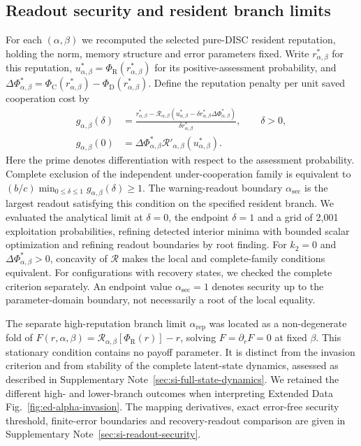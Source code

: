 \documentclass[fleqn,10pt]{wlscirep}
\begin{document}
\subsection*{Readout security and resident branch limits}
\label{sec:methods-readout-security}

For each $(\alpha,\beta)$ we recomputed the selected pure-DISC resident reputation, holding the norm, memory structure and error parameters fixed. Write $r^*_{\alpha,\beta}$ for this reputation, $u^*_{\alpha,\beta}=\Phi_{\mathrm R}(r^*_{\alpha,\beta})$ for its positive-assessment probability, and $\Delta\Phi^*_{\alpha,\beta}=\Phi_{\mathrm C}(r^*_{\alpha,\beta})-\Phi_{\mathrm D}(r^*_{\alpha,\beta})$. Define the reputation penalty per unit saved cooperation cost by
\begin{equation}
\begin{aligned}
g_{\alpha,\beta}(\delta)
&=\frac{r^*_{\alpha,\beta}-\mathcal R_{\alpha,\beta}
\left(u^*_{\alpha,\beta}-\delta r^*_{\alpha,\beta}\Delta\Phi^*_{\alpha,\beta}\right)}
{\delta r^*_{\alpha,\beta}},\qquad \delta>0,\\
g_{\alpha,\beta}(0)
&=\Delta\Phi^*_{\alpha,\beta}\mathcal R'_{\alpha,\beta}(u^*_{\alpha,\beta}).
\end{aligned}
\label{eq:methods-readout-penalty}
\end{equation}
Here the prime denotes differentiation with respect to the assessment probability. Complete exclusion of the independent under-cooperation family is equivalent to $(b/c)\min_{0\leq\delta\leq1}g_{\alpha,\beta}(\delta)\geq1$. The warning-readout boundary $\alpha_{\mathrm{sec}}$ is the largest readout satisfying this condition on the specified resident branch. We evaluated the analytical limit at $\delta=0$, the endpoint $\delta=1$ and a grid of 2,001 exploitation probabilities, refining detected interior minima with bounded scalar optimization and refining readout boundaries by root finding. For $k_2=0$ and $\Delta\Phi^*_{\alpha,\beta}>0$, concavity of $\mathcal R$ makes the local and complete-family conditions equivalent. For configurations with recovery states, we checked the complete criterion separately. An endpoint value $\alpha_{\mathrm{sec}}=1$ denotes security up to the parameter-domain boundary, not necessarily a root of the local equality.

The separate high-reputation branch limit $\alpha_{\mathrm{rep}}$ was located as a non-degenerate fold of $F(r,\alpha,\beta)=\mathcal R_{\alpha,\beta}[\Phi_{\mathrm R}(r)]-r$, solving $F=\partial_rF=0$ at fixed $\beta$. This stationary condition contains no payoff parameter. It is distinct from the invasion criterion and from stability of the complete latent-state dynamics, assessed as described in Supplementary Note~\ref{sec:si-full-state-dynamics}. We retained the different high- and lower-branch outcomes when interpreting Extended Data Fig.~\ref{fig:ed-alpha-invasion}. The mapping derivatives, exact error-free security threshold, finite-error boundaries and recovery-readout comparison are given in Supplementary Note~\ref{sec:si-readout-security}.
\end{document}
